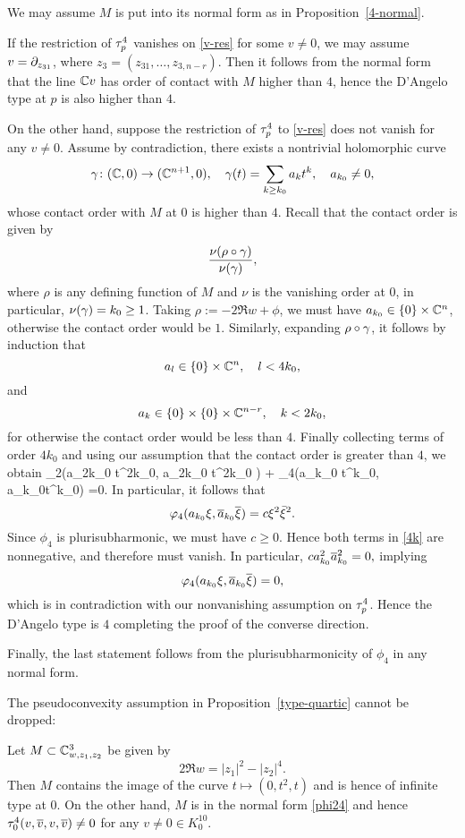 \documentclass[12pt]{amsart}
\begin{document}
\bpf
We may assume $M$ is put into its normal form as in Proposition~\ref{4-normal}.

If the restriction of $\tau^4_p$ vanishes on \eqref{v-res} for some $v\ne 0$,
we may assume $v=\partial_{z_{31}}$, where $z_3=(z_{31},\ldots, z_{3,n-r})$.
Then it follows from the normal form that the line ${\mathbb{C}} v$ has order of contact with $M$
higher than $4$, hence the D'Angelo type at $p$ is also higher than $4$.

On the other hand, suppose the restriction of $\tau^4_p$ to \eqref{v-res} does not vanish for any 
$v\ne 0$. Assume by contradiction, 
there exists a nontrivial holomorphic curve 
$$
	\gamma\colon ({\mathbb{C}},0) \to ({\mathbb{C}}^{n+1},0),
	\quad
	\gamma(t) = \sum_{k\ge k_0} a_k t^k,
	\quad 
	a_{k_0}\ne 0,
$$
whose contact order with $M$ at $0$ is higher than $4$.
Recall that the contact order is given by
$$
	\frac{\nu(\rho\circ\gamma)}{\nu(\gamma)},
$$
where $\rho$ is any defining function of $M$ and $\nu$ is the vanishing order at $0$,
in particular, $\nu(\gamma) = k_0\ge 1$.
Taking $\rho := -2\Re w +\phi$, we must have $a_{k_0}\in \{0\} \times {\mathbb{C}}^n$,
otherwise the contact order would be $1$.
Similarly, expanding $\rho\circ \gamma$, it follows by induction that 
$$
	a_{l}\in \{0\} \times {\mathbb{C}}^{n},
	\quad
	l< 4k_0,
$$
and
$$
	a_{k}\in \{0\} \times \{0\} \times {\mathbb{C}}^{n-r},
	\quad
	k< 2k_0,
$$
for otherwise the contact order would be less than $4$.
Finally collecting terms of order $4k_0$
and using our assumption that the contact order is greater than $4$,
we obtain
\beq{}
 	\phi_2(a_{2k_0} t^{2k_0}, \1a_{2k_0} \1t^{2k_0} ) + \phi_4(a_{k_0} t^{k_0}, \1a_{k_0}\1t^{k_0}) =0.
\eeq
In particular, it follows that 
$$
	\varphi_4(a_{k_0} \xi, \overline{a}_{k_0}\overline{\xi}) = c\xi^2\bar\xi^2.
$$
Since $\phi_4$ is plurisubharmonic, we must have $c\ge 0$.
Hence both terms in \eqref{4k} are nonnegative,
and therefore must vanish.
In particular, 
$
	c a_{k_0}^2 \overline{a}_{k_0}^2 = 0,
$
implying 
$$
	\varphi_4(a_{k_0} \xi, \overline{a}_{k_0}\overline{\xi}) = 0,
$$
which is in contradiction with our nonvanishing assumption on $\tau^4_p$.
Hence the D'Angelo type is $4$ completing the proof of the converse direction.

Finally, the last statement follows from the plurisubharmonicity of $\phi_4$
in any normal form.
\epf


The pseudoconvexity assumption in Proposition~\ref{type-quartic} cannot be dropped:

\be
Let $M\subset {\mathbb{C}}^3_{w, z_1, z_2}$ be given by
$$
	2\Re w = |z_1|^2 - |z_2|^4.
$$
Then $M$ contains the image of the curve $t\mapsto (0, t^2, t)$ 
and is hence of infinite type at $0$.
On the other hand, $M$ is in the normal form \eqref{phi24}
and hence $\tau^4_0(v, \overline{v}, v, \overline{v})\ne 0$  for any $v\ne0\in K^{10}_0$.
\ee
\end{document}
